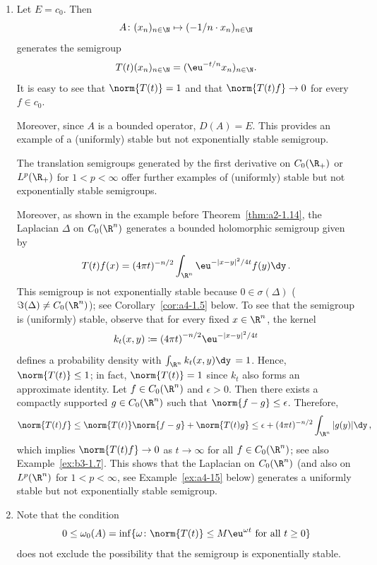 \begin{example}\label{ex:a4-1.2}
\begin{enumerate}[\upshape (i), wide, labelindent=.25em]

\item 
Let $E = c_{0}$. 
Then 
\[
A \colon (x_{n})_{n \in \N} \mapsto (-1/n \cdot x_{n})_{n \in \N}
\] 
generates the semigroup 
\[
T(t)(x_{n})_{n \in \N} = (\eu^{-t/n} x_{n})_{n \in \N}.
\]
It is easy to see that $\norm{T(t)}=1$ and that $\norm{T(t)f}\to 0$ for every $f \in c_{0}$.

Moreover, since $A$ is a bounded operator, $D(A) = E$.
This provides an example of a (uniformly) stable but not exponentially stable semigroup.

The translation semigroups generated by the first derivative on $C_0(\R_{+})$ or $L^{p}(\R_{+})$ for $1 < p < \infty$ offer further examples of (uniformly) stable but not exponentially stable semigroups.

Moreover, as shown in the example before Theorem~\ref{thm:a2-1.14},
the Laplacian $\Delta$ on $C_0(\R^{n})$ generates a bounded holomorphic semigroup given by 
\[
T(t)f(x) = (4\pi t)^{-n/2} \int_{\R^{n}} \eu^{-|x-y|^{2}/4t} f(y)  \dy\,.
\]
This semigroup is not exponentially stable because $0 \in \sigma(\Delta)$ ($\Im(\Delta) \not= C_0(\R^{n})$); see Corollary~\ref{cor:a4-1.5} below. To see that the semigroup is (uniformly) stable, observe that for every fixed $x\in\R^n$, the kernel 
%
\[
	k_t(x,y) \coloneq  \mleft(4\pi t\mright)^{-n/2} \eu^{-|x-y|^{2}/4t}
\]
%
defines a probability density with $\int_{\R^n} k_t(x,y) \dy\, = 1$. Hence, $\norm{T(t)} \le 1$; in fact, $\norm{T(t)} = 1$ since $k_t$ also forms an approximate identity. Let $f \in C_0(\R^{n})$ and $\epsilon > 0$. Then there exists a compactly supported $g \in C_0(\R^{n})$ such that $\norm{f-g} \le \epsilon$. Therefore,
\[
\norm{T(t)f} \le  \norm{T(t)}\norm{f-g} + \norm{T(t)g} \le \epsilon + (4\pi t)^{-n/2} \int_{\R^{n}} |g(y)|  \dy\, ,
\]
which implies  $\norm{T(t)f} \to 0$ as $t\to\infty$ for all $f \in C_0(\R^{n})$; see also Example~\ref{ex:b3-1.7}.
This shows that the Laplacian on $C_0(\R^{n})$ (and also on $L^{p}(\R^{n})$ for $1 < p < \infty$, see 
Example~\ref{ex:a4-15} below) generates a uniformly stable but not exponentially stable semigroup.

\item 
Note that the condition 
\[
0 \leq \omega_{0}(A) = \inf\{\omega\colon\norm{T(t)} \leq M\eu^{\omega t} \text{ for all } t \geq 0\}
\]
does not exclude the possibility that the semigroup is exponentially stable.


\end{enumerate}
\end{example}

